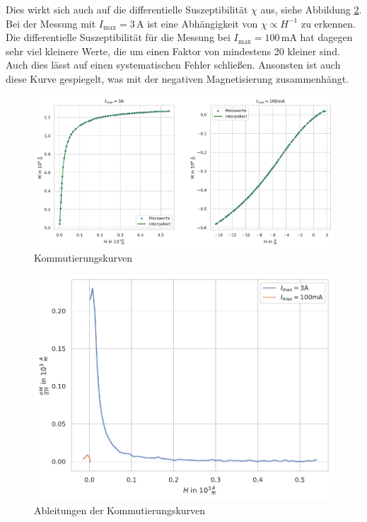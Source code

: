 \documentclass[12pt,a4paper]{scrartcl}
\numberwithin{equation}{section} %
\renewcommand{\[}{} %
\renewcommand{\]}{\noindent} %
\begin{document}
Dies wirkt sich auch auf die differentielle Suszeptibilität \(\chi\) aus, siehe Abbildung \ref{Abb: diff kommut}. Bei der Messung mit \(I_\mathrm{max}= 3\,\mathrm A\) ist eine Abhängigkeit von \(\chi \propto H^{-1}\) zu erkennen. Die differentielle Suszeptibilität für die Messung bei \(I_\mathrm{max}=100\mathrm{\,mA}\) hat dagegen sehr viel kleinere Werte, die um einen Faktor von mindestens 20 kleiner sind. Auch dies lässt auf einen systematischen Fehler schließen. Ansonsten ist auch diese Kurve gespiegelt, was mit der negativen Magnetisierung zusammenhängt.

\begin{figure}
	\centering
	\includegraphics[scale=0.6]{../media/B2.4/3.3.2_Messung.pdf}
	\caption{Kommutierungskurven}
	\label{Abb: kommut}
\end{figure}

\begin{figure}
	\centering
	\includegraphics[scale=0.7]{../media/B2.4/3.3.2_Ableitung.pdf}
	\caption{Ableitungen der Kommutierungskurven}
	\label{Abb: diff kommut}
\end{figure}
\end{document}
